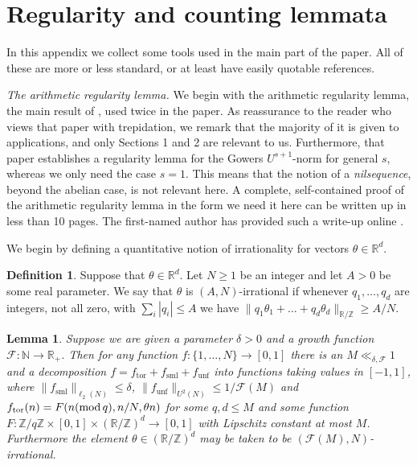 \documentclass[10pt,reqno]{amsart}
\newtheorem{lemma}[theorem]{Lemma}
\theoremstyle{definition}
\newtheorem{definition}[theorem]{Definition}
\theoremstyle{remark}
\newcommand{\mdlem}[1]{\ensuremath{(\mbox{\textup{mod}}\, #1)}}
\renewcommand{\leq}{\leqslant}
\renewcommand{\geq}{\geqslant}
\newcommand\tor{\operatorname{tor}}
\newcommand\sml{\operatorname{sml}}
\newcommand\unf{\operatorname{unf}}
\def\R{\mathbb{R}}
\def\Z{\mathbb{Z}}
\def\N{\mathbb{N}}
\numberwithin{equation}{section}
\begin{document}
\appendix


\section{Regularity and counting lemmata}

\label{appA}

In this appendix we collect some tools used in the main part of the paper. All of these are more or less standard, or at least have easily quotable references.

\emph{The arithmetic regularity lemma.} We begin with the arithmetic regularity lemma, the main result of \cite{green-tao-arithregularity}, used twice in the paper. As reassurance to the reader who views that paper with trepidation, we remark that the majority of it is given to applications, and only Sections 1 and 2 are relevant to us. Furthermore, that paper establishes a regularity lemma for the Gowers $U^{s+1}$-norm for general $s$, whereas we only need the case $s = 1$. This means that the notion of a \emph{nilsequence}, beyond the abelian case, is not relevant here. A complete, self-contained proof of the arithmetic regularity lemma in the form we need it here can be written up in less than 10 pages. The first-named author has provided such a write-up online \cite{sean-writeup}.

We begin by defining a quantitative notion of irrationality for vectors $\theta \in \R^d$.

\begin{definition}\label{irrational-def}
Suppose that $\theta \in \R^d$. Let $N \geq 1$ be an integer and let $A > 0$ be some real parameter. We say that $\theta$ is $(A, N)$-irrational if whenever $q_1, \dots, q_d$ are integers, not all zero, with $\sum_i |q_i| \leq A$ we have $\| q_1 \theta_1 + \dots + q_d \theta_d \|_{\R/\Z} \geq A/N$.
\end{definition}

\begin{lemma}\label{ar} Suppose we are given a parameter $\delta > 0$ and a growth function $\mathcal{F} : \N \rightarrow \R_+$. Then for any function $f : \{1,\dots, N\} \to [0,1]$ there is an $M \ll_{\delta,\mathcal{F}} 1$ and a decomposition $f = f_{\tor} + f_{\sml}+ f_{\unf}$ into functions taking values in $[-1,1]$,  where $\| f_{\sml} \|_{\ell_2(N)} \leq \delta$, $\| f_{\unf} \|_{U^2(N)} \leq 1/\mathcal{F}(M)$ and $f_{\tor}(n) = F(n \mdlem{q}, n/N, \theta n)$ for some $q,d \leq M$ and some function $F : \Z/q\Z \times [0,1] \times (\R/\Z)^d \rightarrow [0,1]$ with Lipschitz constant at most $M$. Furthermore the element $\theta \in (\R/\Z)^d$ may be taken to be $(\mathcal{F}(M), N)$-irrational.
\end{lemma}
\end{document}
